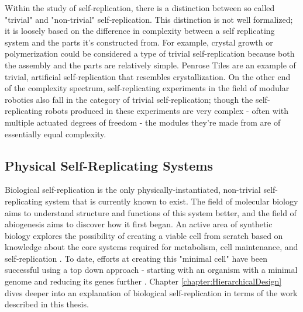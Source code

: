 {%
%
%


Within the study of self-replication, there is a distinction between so called "trivial" and "non-trivial" self-replication.  This distinction is not well formalized; it is loosely based on the difference in complexity between a self replicating system and the parts it's constructed from.  For example, crystal growth or polymerization could be considered a type of trivial self-replication because both the assembly and the parts are relatively simple.  Penrose Tiles \cite{Penrose1958} are an example of trivial, artificial self-replication that resembles crystallization.  On the other end of the complexity spectrum, self-replicating experiments in the field of modular robotics also fall in the category of trivial self-replication; though the self-replicating robots produced in these experiments are very complex  \cite{Zykov2005} - often with multiple actuated degrees of freedom - the modules they're made from are of essentially equal complexity.

\subsection{Physical Self-Replicating Systems}

Biological self-replication is the only physically-instantiated, non-trivial self-replicating system that is currently known to exist.  The field of molecular biology aims to understand structure and functions of this system better, and the field of abiogenesis aims to discover how it first began.  An active area of synthetic biology explores the possibility of creating a viable cell from scratch based on knowledge about the core systems required for metabolism, cell maintenance, and self-replication \cite{Forster2006}.  To date, efforts at creating this "minimal cell" have been successful using a top down approach - starting with an organism with a minimal genome and reducing its genes further \cite{Glass2006} \cite{Gibson2010} \cite{Iii2016}.  Chapter \ref{chapter:HierarchicalDesign} dives deeper into an explanation of biological self-replication in terms of the work described in this thesis. 

}
